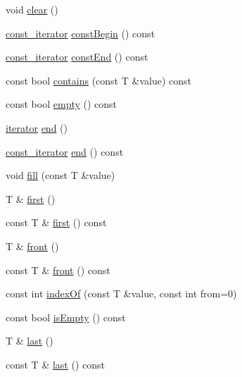 \begin{DoxyCompactItemize}
\item 
void \hyperlink{classprism_1_1_deque_ad644dd68be09f8070e8bf0821ddb6d9b}{clear} ()
\item 
\hyperlink{classprism_1_1_deque_afc2f71fd5b01e963e093f64cc4da94ec}{const\+\_\+iterator} \hyperlink{classprism_1_1_deque_a78472399e10815032ed009b3c50158c5}{const\+Begin} () const 
\item 
\hyperlink{classprism_1_1_deque_afc2f71fd5b01e963e093f64cc4da94ec}{const\+\_\+iterator} \hyperlink{classprism_1_1_deque_ade2ed985db1b24dd4633ca857d93f64f}{const\+End} () const 
\item 
const bool \hyperlink{classprism_1_1_deque_af86c689901918b3a07e606c644d63d37}{contains} (const T \&value) const 
\item 
const bool \hyperlink{classprism_1_1_deque_af1d67b91c768fe60b109ffe5f6dda745}{empty} () const 
\item 
\hyperlink{classprism_1_1_deque_af6fbdfa6e826f7f71b29f4d3cfb72ed1}{iterator} \hyperlink{classprism_1_1_deque_a37296b9dc29075a508028e7fe48cf269}{end} ()
\item 
\hyperlink{classprism_1_1_deque_afc2f71fd5b01e963e093f64cc4da94ec}{const\+\_\+iterator} \hyperlink{classprism_1_1_deque_a1a2ba376e9dfc337310efcf7774a16d3}{end} () const 
\item 
void \hyperlink{classprism_1_1_deque_aa40c9a9b312000990e335e141571e6c6}{fill} (const T \&value)
\item 
T \& \hyperlink{classprism_1_1_deque_a29465bfc91fbe86b231e25b05c01cc33}{first} ()
\item 
const T \& \hyperlink{classprism_1_1_deque_ac10a1de6818406dc7e273b90c326ad84}{first} () const 
\item 
T \& \hyperlink{classprism_1_1_deque_a7fc5bd9398de9e1dc25298d88df665c6}{front} ()
\item 
const T \& \hyperlink{classprism_1_1_deque_ad87236f48d65174a1aa6fbe97d13fa4d}{front} () const 
\item 
const int \hyperlink{classprism_1_1_deque_a1605a58b1afea0d02f0897216322c698}{index\+Of} (const T \&value, const int from=0)
\item 
const bool \hyperlink{classprism_1_1_deque_a848de5d427bfb87099f9992df2ff7596}{is\+Empty} () const 
\item 
T \& \hyperlink{classprism_1_1_deque_a7f273f8177d721d7d539209cd67008a1}{last} ()
\item 
const T \& \hyperlink{classprism_1_1_deque_a36e567ae67706cd1135e730468367bbc}{last} () const 
\item 

\end{DoxyCompactItemize}
